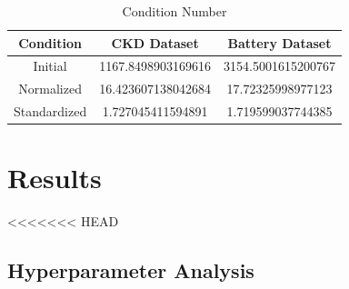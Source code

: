 \documentclass{article}
\begin{document}
\begin{table}[ht]
  \centering
  \caption{Condition Number}
  \begin{tabular}{|c|c|c|}
  \hline
  \textbf{Condition} & \textbf{CKD Dataset} & \textbf{Battery Dataset} \\
  \hline
  Initial      & 1167.8498903169616 & 3154.5001615200767 \\
  Normalized   & 16.423607138042684 & 17.72325998977123 \\
  Standardized & 1.727045411594891  & 1.719599037744385  \\
  \hline
  \end{tabular}
  \end{table}

\section{Results}
<<<<<<< HEAD
\subsection{Hyperparameter Analysis}
\end{document}
